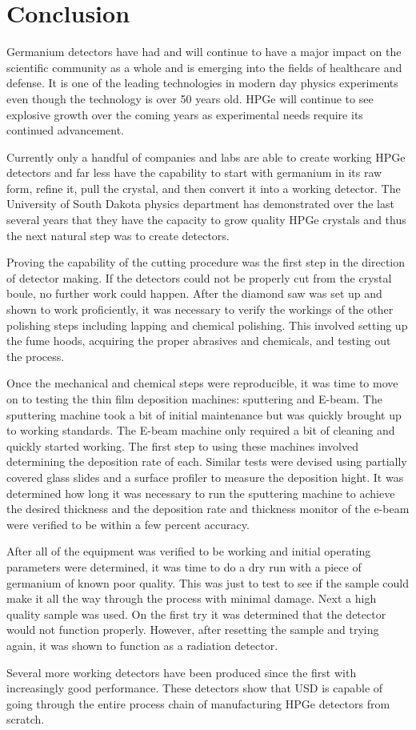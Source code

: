 \chapter{Conclusion}
Germanium detectors have had and will continue to have a major impact on the scientific community as a whole and is emerging into the fields of healthcare and defense.
It is one of the leading technologies in modern day physics experiments even though the technology is over 50 years old.
HPGe will continue to see explosive growth over the coming years as experimental needs require its continued advancement.

Currently only a handful of companies and labs are able to create working HPGe detectors and far less have the capability to start with germanium in its raw form, refine it, pull the crystal, and then convert it into a working detector.
The University of South Dakota physics department has demonstrated over the last several years that they have the capacity to grow quality HPGe crystals and thus the next natural step was to create detectors.

Proving the capability of the cutting procedure was the first step in the direction of detector making.
If the detectors could not be properly cut from the crystal boule, no further work could happen.
After the diamond saw was set up and shown to work proficiently, it was necessary to verify the workings of the other polishing steps including lapping and chemical polishing.
This involved setting up the fume hoods, acquiring the proper abrasives and chemicals, and testing out the process.

Once the mechanical and chemical steps were reproducible, it was time to move on to testing the thin film deposition machines: sputtering and E-beam.
The sputtering machine took a bit of initial maintenance but was quickly brought up to working standards.
The E-beam machine only required a bit of cleaning and quickly started working.
The first step to using these machines involved determining the deposition rate of each.
Similar tests were devised using partially covered glass slides and a surface profiler to measure the deposition hight.
It was determined how long it was necessary to run the sputtering machine to achieve the desired thickness and the deposition rate and thickness monitor of the e-beam were verified to be within a few percent accuracy.

After all of the equipment was verified to be working and initial operating parameters were determined, it was time to do a dry run with a piece of germanium of known poor quality.
This was just to test to see if the sample could make it all the way through the process with minimal damage.
Next a high quality sample was used.
On the first try it was determined that the detector would not function properly.
However, after resetting the sample and trying again, it was shown to function as a radiation detector.

Several more working detectors have been produced since the first with increasingly good performance.
These detectors show that USD is capable of going through the entire process chain of manufacturing HPGe detectors from scratch.
